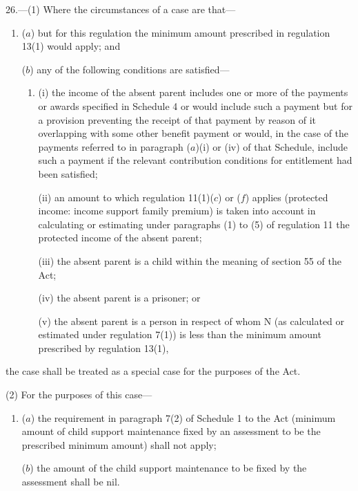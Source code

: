 \documentclass[12pt,a4paper]{article}
\begin{document}
26.—(1) Where the circumstances of a case are that—
\begin{enumerate}\item[]
($a$) but for this regulation the minimum amount prescribed in regulation 13(1) would apply; and

($b$) any of the following conditions are satisfied—
\begin{enumerate}\item[]
(i) the income of the absent parent includes one or more of the payments or awards specified in Schedule 4 or would include such a payment but for a provision preventing the receipt of that payment by reason of it overlapping with some other benefit payment or would, in the case of the payments referred to in paragraph ($a$)(i) or (iv) of that Schedule, include such a payment if the relevant contribution conditions for entitlement had been satisfied;

(ii) an amount to which regulation 
11(1)($c$) or ($f$)  %
applies (protected income: income support family premium) is taken into account in calculating or estimating 
under paragraphs (1) to (5) of regulation 11  %
the protected income of the absent parent;

(iii) the absent parent is a child within the meaning of section 55 of the Act;

(iv) the absent parent is a prisoner; or

(v) the absent parent is a person in respect of whom N (as calculated or estimated under regulation 7(1)) is less than the minimum amount prescribed by regulation 13(1),
\end{enumerate}
\end{enumerate}
the case shall be treated as a special case for the purposes of the Act.

(2) For the purposes of this case—
\begin{enumerate}\item[]
($a$) the requirement in paragraph 7(2) of Schedule 1 to the Act (minimum amount of child support maintenance fixed by an assessment to be the prescribed minimum amount) shall not apply;

($b$) the amount of the child support maintenance to be fixed by the assessment shall be nil.
\end{enumerate}

\end{document}
